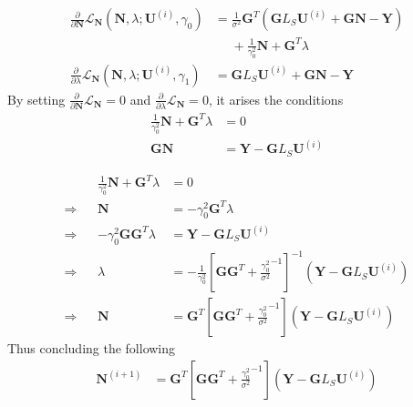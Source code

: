 \documentclass[progressbar=head]{beamer}
\newcommand{\ppar}[1]{ \left( #1 \right) }
\newcommand{\spar}[1]{ \left[ #1 \right] }
\newcommand{\J}{\mathbf{J}}
\newcommand{\Y}{\mathbf{Y}}
\newcommand{\G}{\mathbf{G}}
\newcommand{\U}{\mathbf{U}}
\newcommand{\N}{\mathbf{N}}
\newcommand{\GAM}{\mathbf{\Gamma}}
\newcommand{\SIG}{\mathbf{\Sigma}}
\newcommand{\W}{\mathbf{W}}
\newcommand{\id}{\mathbf{I}}
\begin{document}
\begin{frame}
\begin{align*}
\frac{\partial}{\partial \N}
\mathscr{L}_\N \ppar{\N, \lambda; \U^{(i)}, \gamma_0}
    &=
    \frac{1}{\sigma^2}
    \G^T
    \ppar{\G L_S \U^{(i)} + \G \N - \Y}
    \\
    &\phantom{=}
    +
    \frac{1}{\gamma_0^2} {\N}
    +
    \G^T \lambda
    \\
    \frac{\partial}{\partial \lambda} 
    \mathscr{L}_\N \ppar{\N, \lambda; \U^{(i)}, \gamma_1}
    &=
    \G L_S \U^{(i)} + \G \N - \Y
\end{align*}
By setting $\frac{\partial}{\partial \N} \mathscr{L}_\N = 0$ and 
$\frac{\partial}{\partial \lambda} \mathscr{L}_\N = 0$, it arises the conditions
\begin{align*}
    {\frac{1}{\gamma_0^2} { \N}
    +
    \G^T \lambda} &= 0
    \\
    \G \N 
    &= \Y - \G L_S \U^{(i)} 
\end{align*}
\end{frame}

\begin{frame}
\begin{align*}
&&
{\frac{1}{\gamma_0^2} { \N}
    +
    \G^T \lambda} &= 0
\\
\Rightarrow
&&
\N &= -\gamma_0^2 \G^T \lambda
\\
\Rightarrow
&&
-\gamma_0^2 \G \G^T \lambda
&=
\Y - \G L_S \U^{(i)} 
\\
\Rightarrow
&&
\lambda &=
-\frac{1}{\gamma_0^2} \spar{\G \G^T+ \frac{\gamma_0^2}{\sigma^2}^{-1}}^{-1} \ppar{\Y - \G L_S \U^{(i)} }
\\
\Rightarrow
&&
\N &=
\G^T \spar{\G \G^T+ \frac{\gamma_0^2}{\sigma^2}^{-1}} \ppar{\Y - \G L_S \U^{(i)} }
\end{align*}
Thus concluding the following
\begin{align*}
\N^{(i+1)} &=
\G^T \spar{\G \G^T+ \frac{\gamma_0^2}{\sigma^2}^{-1}} \ppar{\Y - \G L_S \U^{(i)} }
\end{align*}
\end{frame}

%
\end{document}
